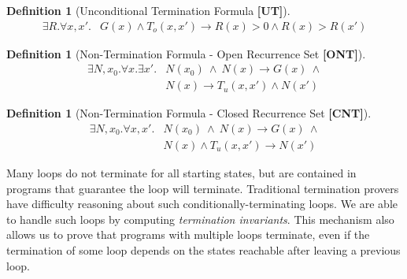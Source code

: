 \documentclass[preprint]{sigplanconf}
\theoremstyle{definition}
\newtheorem{definition}[theorem]{Definition}
\begin{document}
\begin{figure*}
\begin{framed}
\begin{definition}[Unconditional Termination Formula {\bf [UT]}]
\label{def:UT}
\begin{align*}
 \exists R . \forall x, x' . & G(x) \wedge T_o(x, x') \rightarrow R(x) > 0 \wedge R(x) > R(x')
\end{align*}
\end{definition}

\begin{definition}[Non-Termination Formula - Open Recurrence Set  {\bf [ONT]}]
\label{def:ont}
 \begin{align*}
  \exists N, x_0 . \forall x . \exists x' . & N(x_0) ~ \wedge ~ N(x) \rightarrow G(x) ~ \wedge \\
							& N(x) \rightarrow T_u(x, x') \wedge N(x') 
 \end{align*}
\end{definition}

\begin{definition}[Non-Termination Formula - Closed Recurrence Set {\bf [CNT]}]
\label{def:cnt}
 \begin{align*}
  \exists N, x_0 . \forall x, x' . & N(x_0) ~ \wedge ~ N(x) \rightarrow G(x) ~ \wedge \\
							& N(x) \wedge T_u(x, x') \rightarrow N(x') 
 \end{align*}
\end{definition}


\end{framed}
\end{figure*}

\iffalse
Many loops do not terminate for all starting states, but are contained in programs that guarantee the loop will
terminate.  Traditional termination provers have difficulty reasoning about such conditionally-terminating loops.
We are able to handle such loops by computing \emph{termination invariants}.  This mechanism also allows us to
prove that programs with multiple loops terminate, even if the termination of some loop depends on the states
reachable after leaving a previous loop.
\end{document}
